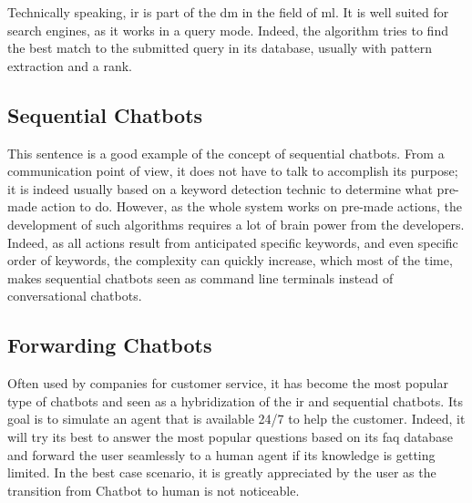Technically speaking, \gls{ir} is part of the \gls{dm} in the field of \gls{ml}. It is well suited for search engines, as it works in a query mode. Indeed, the algorithm tries to find the best match to the submitted query in its database, usually with pattern extraction and a rank. 

\subsection{Sequential Chatbots}
This sentence is a good example of the concept of sequential chatbots. From a communication point of view, it does not have to talk to accomplish its purpose; it is indeed usually based on a keyword detection technic to determine what pre-made action to do. However, as the whole system works on pre-made actions, the development of such algorithms requires a lot of brain power from the developers. Indeed, as all actions result from anticipated specific keywords, and even specific order of keywords, the complexity can quickly increase, which most of the time, makes sequential chatbots seen as command line terminals instead of conversational chatbots.

\subsection{Forwarding Chatbots}
Often used by companies for customer service, it has become the most popular type of chatbots and seen as a hybridization of the \gls{ir} and sequential chatbots. Its goal is to simulate an agent that is available 24/7 to help the customer. Indeed, it will try its best to answer the most popular questions based on its \gls{faq} database and forward the user seamlessly to a human agent if its knowledge is getting limited. In the best case scenario, it is greatly appreciated by the user as the transition from Chatbot to human is not noticeable.

